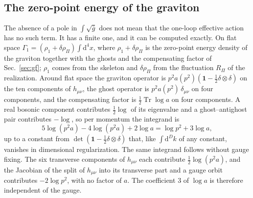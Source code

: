 \documentclass[aps,prd,10pt,twocolumn,superscriptaddress,nofootinbib,floatfix,longbibliography]{revtex4-2}
\newcommand{\dd}{\mathrm{d}}
\newcommand{\Tr}{\operatorname{Tr}}
\begin{document}
\subsection{The zero-point energy of the graviton}
\label{sec:vacuum}

The absence of a pole in $\int\sqrt{\bar g}$ does not mean that the one-loop effective action has no such term. It has a finite one, and it can be computed exactly. On flat space $\Gamma_1=(\rho_1+\delta\rho_\Pi)\int\dd^4x$, where $\rho_1+\delta\rho_\Pi$ is the zero-point energy density of the graviton together with the ghosts and the compensating factor of Sec.~\ref{sec:gf}; $\rho_1$ comes from the skeleton and $\delta\rho_\Pi$ from the fluctuation $R_\Pi$ of the realization. Around flat space the graviton operator is $p^2a(p^2)(\mathbf 1-\frac12\delta\otimes\delta)$ on the ten components of $h_{\mu\nu}$, the ghost operator is $p^2a(p^2)\,\delta_{\mu\nu}$ on four components, and the compensating factor is $\frac12\Tr\log a$ on four components. A real bosonic component contributes $\frac12\log$ of its eigenvalue and a ghost--antighost pair contributes $-\log$, so per momentum the integrand is
\begin{equation}
\label{eq:count}
5\log(p^2a)-4\log(p^2a)+2\log a=\log p^2+3\log a,
\end{equation}
up to a constant from $\det(\mathbf 1-\frac12\delta\otimes\delta)$ that, like $\int\dd^Dk$ of any constant, vanishes in dimensional regularization. The same integrand follows without gauge fixing. The six transverse components of $h_{\mu\nu}$ each contribute $\frac12\log(p^2a)$, and the Jacobian of the split of $h_{\mu\nu}$ into its transverse part and a gauge orbit contributes $-2\log p^2$, with no factor of $a$. The coefficient $3$ of $\log a$ is therefore independent of the gauge.
\end{document}
